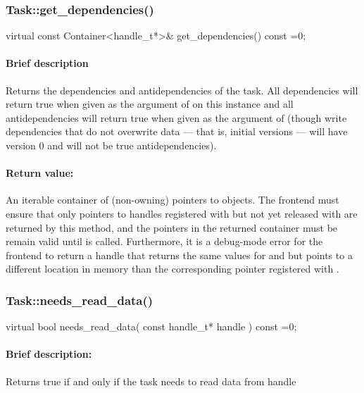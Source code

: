 \subsubsection{Task::get\_dependencies()}
\begin{CppCode}
    virtual
    const Container<handle_t*>&
    get_dependencies() const =0;
\end{CppCode}

\paragraph{Brief description} Returns the dependencies and antidependencies of the task.
       All dependencies will return true when given as the argument of 
       on this instance and all antidependencies will return true when given as the argument of
        (though write dependencies that do not overwrite data --- that is,
       initial versions --- will have version 0 and will not be true antidependencies).
     
\paragraph{Return value:} An iterable container of (non-owning) pointers to  objects.  The
       frontend must ensure that only pointers to handles registered with 
       but not yet released with  are returned by this method, and the
       pointers in the returned container must be remain valid until 
       is called.  Furthermore, it is a debug-mode error for the frontend to return a handle that
       returns the same values for  and  but points to a different location
       in memory than the corresponding pointer registered with .


\subsubsection{Task::needs\_read\_data()}
\begin{CppCode}
    virtual bool
    needs_read_data(
      const handle_t* handle
    ) const =0;
\end{CppCode}

\paragraph{Brief description:} Returns true if and only if the task needs to read data from handle
     
